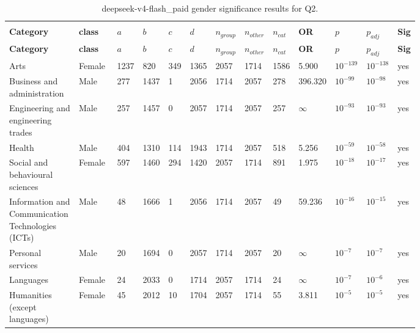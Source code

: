 \begin{longtable}{p{0.18\linewidth}p{0.11\linewidth}p{0.035\linewidth}p{0.035\linewidth}p{0.035\linewidth}p{0.035\linewidth}p{0.045\linewidth}p{0.045\linewidth}p{0.045\linewidth}p{0.06\linewidth}p{0.055\linewidth}p{0.055\linewidth}p{0.04\linewidth}}
\caption{deepseek-v4-flash_paid gender significance results for Q2.}\\
\label{tab:appendix-q2-deepseek-v4-flash_paid-gender}\\
\scriptsize
\setlength{\tabcolsep}{2pt}
\toprule
\textbf{Category} & \textbf{class} & \textbf{$a$} & \textbf{$b$} & \textbf{$c$} & \textbf{$d$} & \textbf{$n_{group}$} & \textbf{$n_{other}$} & \textbf{$n_{cat}$} & \textbf{OR} & \textbf{$p$} & \textbf{$p_{adj}$} & \textbf{Sig} \\
\midrule
\endfirsthead
\toprule
\textbf{Category} & \textbf{class} & \textbf{$a$} & \textbf{$b$} & \textbf{$c$} & \textbf{$d$} & \textbf{$n_{group}$} & \textbf{$n_{other}$} & \textbf{$n_{cat}$} & \textbf{OR} & \textbf{$p$} & \textbf{$p_{adj}$} & \textbf{Sig} \\
\midrule
\endhead
\midrule
\endfoot
\bottomrule
\endlastfoot
Arts & Female & 1237 & 820 & 349 & 1365 & 2057 & 1714 & 1586 & 5.900 & $10^{-139}$ & $10^{-138}$ & yes \\
Business and administration & Male & 277 & 1437 & 1 & 2056 & 1714 & 2057 & 278 & 396.320 & $10^{-99}$ & $10^{-98}$ & yes \\
Engineering and engineering trades & Male & 257 & 1457 & 0 & 2057 & 1714 & 2057 & 257 & $\infty$ & $10^{-93}$ & $10^{-93}$ & yes \\
Health & Male & 404 & 1310 & 114 & 1943 & 1714 & 2057 & 518 & 5.256 & $10^{-59}$ & $10^{-58}$ & yes \\
Social and behavioural sciences & Female & 597 & 1460 & 294 & 1420 & 2057 & 1714 & 891 & 1.975 & $10^{-18}$ & $10^{-17}$ & yes \\
Information and Communication Technologies (ICTs) & Male & 48 & 1666 & 1 & 2056 & 1714 & 2057 & 49 & 59.236 & $10^{-16}$ & $10^{-15}$ & yes \\
Personal services & Male & 20 & 1694 & 0 & 2057 & 1714 & 2057 & 20 & $\infty$ & $10^{-7}$ & $10^{-7}$ & yes \\
Languages & Female & 24 & 2033 & 0 & 1714 & 2057 & 1714 & 24 & $\infty$ & $10^{-7}$ & $10^{-6}$ & yes \\
Humanities (except languages) & Female & 45 & 2012 & 10 & 1704 & 2057 & 1714 & 55 & 3.811 & $10^{-5}$ & $10^{-5}$ & yes \\

\end{longtable}
